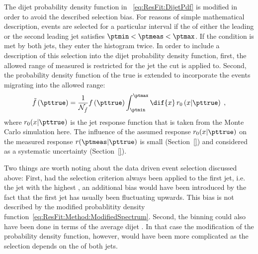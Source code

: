 The dijet probability density function in ~\eqref{eq:ResFit:DijetPdf} is modified in order to avoid the described selection bias.
For reasons of simple mathematical description, events are selected for a particular interval if the \pt of either the leading or the second leading jet satisfies $\ptmin < \ptmeas < \ptmax$.
If the condition is met by both jets, they enter the histogram twice.
In order to include a description of this selection into the dijet probability density function, first, the allowed range of measured \pt is restricted for the jet the \pt cut is applied to.
Second, the probability density function of the true \pt is extended to incorporate the events migrating into the allowed \pt range:
\begin{equation}
  \label{eq:ResFit:Method:ModifiedSpectrum}
  \tilde{f}\left(\pttrue\right) = \frac{1}{\mathcal{N}_{\tilde{f}}}
  f\left(\pttrue\right) \int^{\ptmax}_{\ptmin}\dif{x}\,r_{0}\left(x|\pttrue\right) \; ,
\end{equation}
where $r_{0}(x|\pttrue)$ is the jet \pt response function that is taken from the Monte Carlo simulation here.
The influence of the assumed response $r_{0}(x|\pttrue)$ on the measured response $r(\ptmeas|\pttrue)$ is small (Section~\ref{}) and considered as a systematic uncertainty (Section~\ref{}).

Two things are worth noting about the data driven event selection discussed above:
First, had the selection criterion always been applied to the first jet, i.e. the jet with the highest \ptmeas, an additional bias would have been introduced by the fact that the first jet has usually been fluctuating upwards.
This bias is not described by the modified probablitity density function~\eqref{eq:ResFit:Method:ModifiedSpectrum}.
Second, the binning could also have been done in terms of the average dijet \pt.
In that case the modification of the probability density function, however, would have been more complicated as the selection depends on the \pt of both jets.
